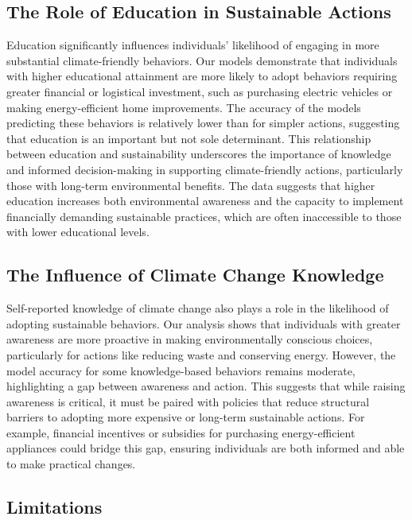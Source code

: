 \documentclass[
  letterpaper,
  DIV=11,
  numbers=noendperiod]{scrartcl}
\begin{document}
\subsection{The Role of Education in Sustainable
Actions}\label{sec-second-point}

Education significantly influences individuals' likelihood of engaging
in more substantial climate-friendly behaviors. Our models demonstrate
that individuals with higher educational attainment are more likely to
adopt behaviors requiring greater financial or logistical investment,
such as purchasing electric vehicles or making energy-efficient home
improvements. The accuracy of the models predicting these behaviors is
relatively lower than for simpler actions, suggesting that education is
an important but not sole determinant. This relationship between
education and sustainability underscores the importance of knowledge and
informed decision-making in supporting climate-friendly actions,
particularly those with long-term environmental benefits. The data
suggests that higher education increases both environmental awareness
and the capacity to implement financially demanding sustainable
practices, which are often inaccessible to those with lower educational
levels.

\subsection{The Influence of Climate Change
Knowledge}\label{sec-third-point}

Self-reported knowledge of climate change also plays a role in the
likelihood of adopting sustainable behaviors. Our analysis shows that
individuals with greater awareness are more proactive in making
environmentally conscious choices, particularly for actions like
reducing waste and conserving energy. However, the model accuracy for
some knowledge-based behaviors remains moderate, highlighting a gap
between awareness and action. This suggests that while raising awareness
is critical, it must be paired with policies that reduce structural
barriers to adopting more expensive or long-term sustainable actions.
For example, financial incentives or subsidies for purchasing
energy-efficient appliances could bridge this gap, ensuring individuals
are both informed and able to make practical changes.

\subsection{Limitations}\label{limitations}
\end{document}
